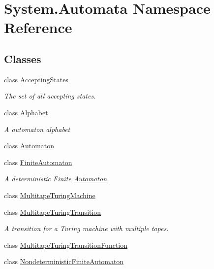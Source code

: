 \hypertarget{namespace_system_1_1_automata}{}\section{System.\+Automata Namespace Reference}
\label{namespace_system_1_1_automata}
\subsection*{Classes}
\begin{DoxyCompactItemize}
\item 
class \mbox{\hyperlink{class_system_1_1_automata_1_1_accepting_states}{Accepting\+States}}
\begin{DoxyCompactList}\small\item\em The set of all accepting states. \end{DoxyCompactList}\item 
class \mbox{\hyperlink{class_system_1_1_automata_1_1_alphabet}{Alphabet}}
\begin{DoxyCompactList}\small\item\em A automaton alphabet \end{DoxyCompactList}\item 
class \mbox{\hyperlink{class_system_1_1_automata_1_1_automaton}{Automaton}}
\item 
class \mbox{\hyperlink{class_system_1_1_automata_1_1_finite_automaton}{Finite\+Automaton}}
\begin{DoxyCompactList}\small\item\em A deterministic Finite \mbox{\hyperlink{class_system_1_1_automata_1_1_automaton}{Automaton}} \end{DoxyCompactList}\item 
class \mbox{\hyperlink{class_system_1_1_automata_1_1_multitape_turing_machine}{Multitape\+Turing\+Machine}}
\item 
class \mbox{\hyperlink{class_system_1_1_automata_1_1_multitape_turing_transition}{Multitape\+Turing\+Transition}}
\begin{DoxyCompactList}\small\item\em A transition for a Turing machine with multiple tapes. \end{DoxyCompactList}\item 
class \mbox{\hyperlink{class_system_1_1_automata_1_1_multitape_turing_transition_function}{Multitape\+Turing\+Transition\+Function}}
\item 
class \mbox{\hyperlink{class_system_1_1_automata_1_1_nondeterministic_finite_automaton}{Nondeterministic\+Finite\+Automaton}}

\end{DoxyCompactItemize}
